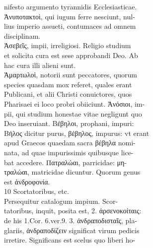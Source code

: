 \documentclass{article}
\begin{document}
\begin{pages}
                nifesto argumento tyrannidis Ecclesiasticae. \\
                Ἀνυποτακτοὶ, qui iugum ferre nesciunt, nul- \\
                lius imperio assueti, contumaces ad omnem \\
                disciplinam. \\
                Ἀσεβεῖς, impii, irreligiosi. Religio studium \\
                et solicita cura est sese approbandi Deo. Ab \\
                hac cura illi alieni sunt. \\
                Ἁμαρτωλοὶ, notorii sunt peccatores, quorum \\
                species quasdam mox referet, quales erant \\
                Publicani, et alii Christi conuictores, quos \\
                Pharisaei ei loco probri obiiciunt. Ἀνόσιοι, im- \\
                pii, qui studium honestae vitae negligunt quo \\
                Deo inseruiant. Βέβηλοι, prophani, impuri: \\
                Βήλος dicitur purus, βέβηλος, impurus: vt erant \\
                apud Graecos quaedam sacra βέβηλα nomi- \\
                nata, ad quae impurissimis quibusque lice- \\
                bat accedere. Πατραλώαι, parricidae: μη- \\
                τραλώαι, matricidae dicuntur. Quorum genus \\
                est ἀνδροφονία. \\
                10 Scortatoribus, etc. \\
                Persequitur catalogum impium. Scor- \\
                tatoribus, inquit, posita est, 2. ἀρσενοκοίταις: \\
                de his 1.Cor. 6.ver.9. 3. ἀνδραποδισταῖς, pla- \\
                glariis, ἀνδραποδίζειν significat virum pedicis \\
                irretire. Significans est scelus quo liberi ho- \\

\end{pages}
\end{document}
